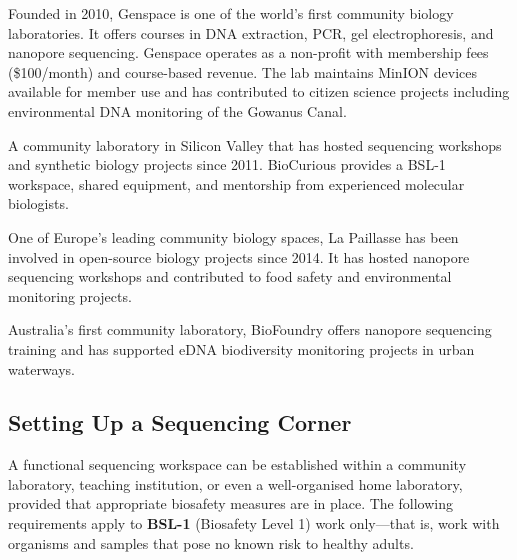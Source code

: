 \begin{description}[style=nextline, font=\bfseries, itemsep=4pt]
  \item[Genspace (New York City, USA)]
  Founded in 2010, Genspace is one of the world's first community biology laboratories. It offers courses in DNA extraction, \acrshort{PCR}, gel electrophoresis, and nanopore sequencing. Genspace operates as a non-profit with membership fees (\$100/month) and course-based revenue. The lab maintains MinION devices available for member use and has contributed to citizen science projects including environmental DNA monitoring of the Gowanus Canal.

  \item[BioCurious (Santa Clara, California, USA)]
  A community laboratory in Silicon Valley that has hosted sequencing workshops and synthetic biology projects since 2011. BioCurious provides a BSL-1 workspace, shared equipment, and mentorship from experienced molecular biologists.

  \item[La Paillasse (Paris, France)]
  One of Europe's leading community biology spaces, La Paillasse has been involved in open-source biology projects since 2014. It has hosted nanopore sequencing workshops and contributed to food safety and environmental monitoring projects.

  \item[BioFoundry (Sydney, Australia)]
  Australia's first community laboratory, BioFoundry offers nanopore sequencing training and has supported eDNA biodiversity monitoring projects in urban waterways.
\end{description}

\subsection{Setting Up a Sequencing Corner}
\label{subsec:accessible:setup}

A functional sequencing workspace can be established within a community laboratory, teaching institution, or even a well-organised home laboratory, provided that appropriate biosafety measures are in place. The following requirements apply to \textbf{BSL-1} (Biosafety Level 1) work only---that is, work with organisms and samples that pose no known risk to healthy adults.


